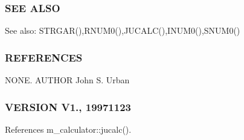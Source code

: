 \subsubsection*{S\+EE A\+L\+SO}

See also\+: S\+T\+R\+G\+A\+R(),R\+N\+U\+M0(),J\+U\+C\+A\+L\+C(),I\+N\+U\+M0(),S\+N\+U\+M0() \subsubsection*{R\+E\+F\+E\+R\+E\+N\+C\+ES}

N\+O\+NE. A\+U\+T\+H\+OR John S. Urban \subsubsection*{V\+E\+R\+S\+I\+ON V1., 19971123}

References m\+\_\+calculator\+::jucalc().

